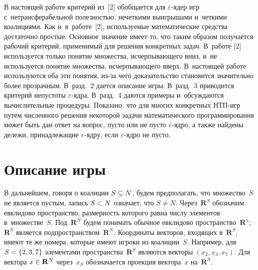 \begin{multicols}{2}
    В настоящей работе критерий из~[2] обобщается для $\varepsilon$-ядер 
игр с~нетрансферабельной полезностью, нечеткими выигрышами и~четкими 
коалициями. Как и~в~работе~[2], используемые математические средства 
достаточно простые. Основное значение имеет то, что таким образом 
получается рабочий критерий, применимый для решения конкретных задач. 
В~работе [2] используется только понятие множества, исчерпывающего вниз, 
и~не используется понятие множества, исчерпывающего вверх. В~настоящей 
работе используются оба эти понятия, из-за чего доказательство становится 
значительно более прозрачным. В~разд.~2 дается описание игры. В~разд.~3 
приводится критерий непустоты $\varepsilon$-яд\-ра. В~разд.~4 даются 
примеры и~обсуждаются вычислительные процедуры. Показано, что для 
многих конкретных НТП-игр путем численного 
решения некоторой задачи математического программирования может быть дан 
ответ на вопрос, пусто или не пусто $\varepsilon$-яд\-ро, а также найдены 
дележи, принадлежащие $\varepsilon$-яд\-ру, если $\varepsilon$-яд\-ро не пусто.

\section{Описание игры}

\vspace*{-20pt}

    В дальнейшем, говоря о коалиции $S\hm\subseteq N$, будем 
предполагать, что множество~$S$ не является пус\-тым, запись $S\hm\subset N$ 
означает, что $S\not= N$. Через~$\mathbf{R}^S$ обозначим евклидово 
пространство, размерность которого равна числу элементов в~множестве~$S$. 
Под~$\mathbf{R}^N$ будем понимать обычное евклидово 
пространство~$\mathbf{R}^n$; $\mathbf{R}^S$ является 
подпространством~$\mathbf{R}^N$. Координаты векторов, входящих 
в~$\mathbf{R}^S$, имеют те же номера, которые имеют игроки из 
коалиции~$S$. Например, для $S\hm= \{2,3,7\}$ элементами 
пространства~$\mathbf{R}^S$ являются векторы $(x_2,x_3,x_7)$. Для вектора 
$x\hm\in \mathbf{R}^N$ через~$x_S$ обозначается проекция вектора~$x$ 
на~$\mathbf{R}^S$. 
    

\end{multicols}
